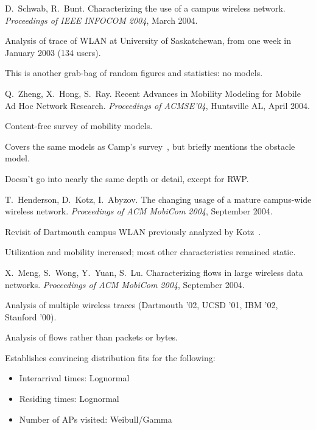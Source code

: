 \documentclass{article}
\newcounter{myEnumCounter}
\newcounter{mySaveCounter}
\renewenvironment{enumerate}{%
  \begin{list}{[\arabic{myEnumCounter}]}{\usecounter{myEnumCounter}%
  \setcounter{myEnumCounter}{\value{mySaveCounter}}}
  }{%
  \setcounter{mySaveCounter}{\value{myEnumCounter}}\end{list}%
}
\begin{document}
\begin{enumerate}
D.~Schwab, R.~Bunt.
Characterizing the use of a campus wireless network.
\textit{Proceedings of IEEE INFOCOM 2004}, March 2004.

\begin{notes}
\item Analysis of trace of WLAN at University of Saskatchewan, from one week in January 2003 (134 users).
\item This is another grab-bag of random figures and statistics: no models.
\end{notes}

Q.~Zheng, X.~Hong, S.~Ray.
Recent Advances in Mobility Modeling for Mobile Ad Hoc Network Research.
\textit{Proceedings of ACMSE’04}, Huntsville AL, April 2004.

\begin{notes}
\item Content-free survey of mobility models.
\item Covers the same models as Camp's survey~\cite{Camp02}, but briefly mentions the obstacle model.
\item Doesn't go into nearly the same depth or detail, except for RWP.
\end{notes}


T.~Henderson, D.~Kotz, I.~Abyzov.
The changing usage of a mature campus-wide wireless network.
\textit{Proceedings of ACM MobiCom 2004}, September 2004.

\begin{notes}
\item Revisit of Dartmouth campus WLAN previously analyzed by Kotz~\cite{Kotz02}.
\item Utilization and mobility increased; most other characteristics remained static.
\end{notes}

X.~Meng, S.~Wong, Y.~Yuan, S.~Lu.
Characterizing flows in large wireless data networks.
\textit{Proceedings of ACM MobiCom 2004}, September 2004.

\begin{notes}
\item Analysis of multiple wireless traces (Dartmouth '02, UCSD '01, IBM '02, Stanford '00).
\item Analysis of flows rather than packets or bytes.
\item Establishes convincing distribution fits for the following:
\begin{itemize}
	\item Interarrival times: Lognormal
	\item Residing times: Lognormal
	\item Number of APs visited: Weibull/Gamma
\end{itemize}
\end{notes}


\end{enumerate}
\end{document}
